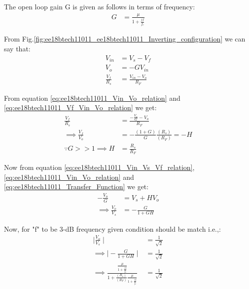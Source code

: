 \begin{enumerate}[label=\arabic*.,ref=\theenumi]
The open loop gain G is given as follows in terms of frequency:
\begin{align}
    G &= \frac{\mu}{1 + \frac{jf}{f_{c}}}
\end{align}

From Fig.\ref{fig:ee18btech11011_ee18btech11011_Inverting_configuration} we can say that:
\begin{align}
    V_{i n} &= V_{s} - V_{f}
    \label{eq:ee18btech11011_Vin_Vs_Vf_relation}
    \\
    V_{o} &= -GV_{i n}
    \label{eq:ee18btech11011_Vin_Vo_relation}
    \\
    \frac{V_{f}}{R_{s}} &= \frac{V_{i n} - V_{o}}{R_{F}}
    \label{eq:ee18btech11011_Vf_Vin_Vo_relation}
\end{align}

From equation \ref{eq:ee18btech11011_Vin_Vo_relation} and \ref{eq:ee18btech11011_Vf_Vin_Vo_relation} we get:
\begin{align}
    \frac{V_{f}}{R_{s}} &= \frac{-\frac{V_{o}}{G} - V_{o}}{R_{F}}
    \\
    \implies \frac{V_{f}}{V_{o}} &= -\frac{(1 + G)}{G}\frac{(R_{s})}{(R_{F})} = -H
    \label{eq:ee18btech11011_Transfer_Function}
    \\
    \because G>>1 \implies H &= \frac{R_{s}}{R_{F}}
\end{align}

Now from equation \ref{eq:ee18btech11011_Vin_Vs_Vf_relation}, \ref{eq:ee18btech11011_Vin_Vo_relation} and \ref{eq:ee18btech11011_Transfer_Function} we get:
\begin{align}
    -\frac{V_{o}}{G} &= V_{s} + HV_{o}
    \\
    \implies \frac{V_{o}}{V_{s}} &= -\frac{G}{1 + GH}
\end{align}

Now, for "f" to be 3-dB frequency given condition should be match i.e.,:
\begin{align}
    \mid\frac{V_{o}}{V_{s}}\mid &= \frac{1}{\sqrt{2}}
    \\
    \implies \mid-\frac{G}{1 + GH}\mid &= \frac{1}{\sqrt{2}}
    \\
    \implies \frac{\frac{\mu}{1 + \frac{jf}{f_{c}}}}{1 + \frac{(R_{s})}{(R_{F})}\frac{\mu}{1 + \frac{jf}{f_{c}}}} &= \frac{1}{\sqrt{2}}
\end{align}
 
\begin{table}[!ht]
\centering

\caption{}
\label{table: Values_Table}
\end{table}


\end{enumerate}
